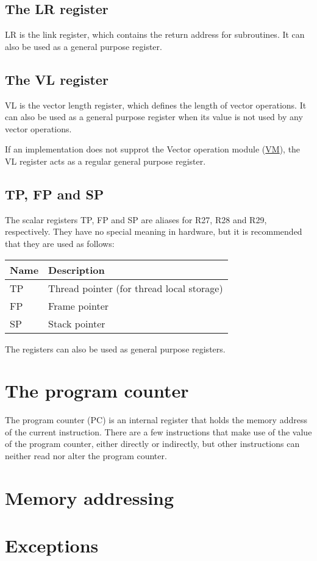 \subsection{The LR register}

LR is the link register, which contains the return address for subroutines. It
can also be used as a general purpose register.

\subsection{The VL register}

VL is the vector length register, which defines the length of vector
operations. It can also be used as a general purpose register when its value
is not used by any vector operations.

If an implementation does not supprot the Vector operation module
(\hyperref[module:VM]{VM}), the VL register acts as a regular general purpose
register.

\subsection{TP, FP and SP}

The scalar registers TP, FP and SP are aliases for R27, R28 and R29,
respectively. They have no special meaning in hardware, but it is recommended
that they are used as follows:

\begin{tabular}{|l|l|}
  \hline
  \textbf{Name} & \textbf{Description} \\
  \hline
  TP & Thread pointer (for thread local storage) \\
  \hline
  FP & Frame pointer \\
  \hline
  SP & Stack pointer \\
  \hline
\end{tabular}

The registers can also be used as general purpose registers.

\section{The program counter}

The program counter (PC) is an internal register that holds the memory address
of the current instruction. There are a few instructions that make use of the
value of the program counter, either directly or indirectly, but other
instructions can neither read nor alter the program counter.

\section{Memory addressing}

\tbd

\section{Exceptions}

\tbd
